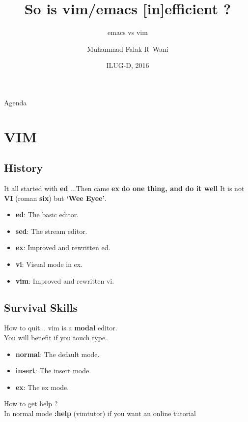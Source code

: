 \documentclass{beamer}
\title{So is vim/emacs [in]efficient ?}
\subtitle{emacs vs vim}
\author{Muhammad Falak R~Wani }
\institute[IIIT-D] %
{
	\inst{}
  Department of Computer Science\\
  IIIT-D
}
\date{ILUG-D, 2016}
\begin{document}
\begin{frame}
	\titlepage
\end{frame}

\begin{frame}{Agenda}
	\tableofcontents
\end{frame}

\section{VIM}

\subsection{History}

\begin{frame}{It all started with \textbf{ed} ...}{Then came \textbf{ex}}
	\textbf{do one thing, and do it well}
	It is not \textbf{VI} (roman \textbf{six}) but \textbf{`Wee Eyee'}.\\
	\pause
	\begin{itemize}
		\item {
				\textbf{ed}: The basic editor.
				\pause

			}
		\item {
				\textbf{sed}: The stream editor.
				\pause

			}
		\item {
				\textbf{ex}: Improved and rewritten ed.
				\pause
			}
		\item {
				\textbf{vi}: Visual mode in ex.
				\pause
			}
		\item {
				\textbf{vim}: Improved and rewritten vi.

			}
	\end{itemize}
\end{frame}

\subsection{Survival Skills}

\begin{frame}{How to quit...}
	vim is a \textbf{modal} editor. \\ \pause
	You will benefit if you touch type.\\ \pause
	\begin{itemize}
		\item {
				\textbf{normal}: The default mode.
				\pause
				}
			\item {   
				\textbf{insert}: The insert mode.
				\pause
			}
		\item {
				\textbf{ex}: The ex mode.
				\pause
			}
	\end{itemize}
	How to get \alert{help }?\\ \pause
	In normal mode \textbf{:help}
	\alert(vimtutor) if you want an online tutorial
\end{frame}
\end{document}
